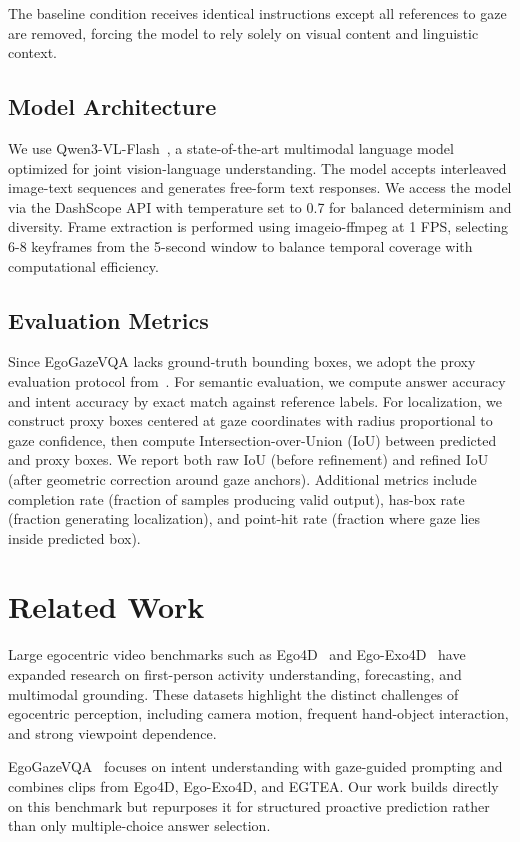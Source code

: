 \documentclass[11pt]{article}
\begin{document}
The baseline condition receives identical instructions except all references to gaze are removed, forcing the model to rely solely on visual content and linguistic context.

\subsection{Model Architecture}
We use Qwen3-VL-Flash~\cite{bai2025qwen3vl}, a state-of-the-art multimodal language model optimized for joint vision-language understanding. The model accepts interleaved image-text sequences and generates free-form text responses. We access the model via the DashScope API with temperature set to 0.7 for balanced determinism and diversity. Frame extraction is performed using imageio-ffmpeg at 1 FPS, selecting 6-8 keyframes from the 5-second window to balance temporal coverage with computational efficiency.

\subsection{Evaluation Metrics}
Since EgoGazeVQA lacks ground-truth bounding boxes, we adopt the proxy evaluation protocol from~\citet{peng2025eye}. For semantic evaluation, we compute answer accuracy and intent accuracy by exact match against reference labels. For localization, we construct proxy boxes centered at gaze coordinates with radius proportional to gaze confidence, then compute Intersection-over-Union (IoU) between predicted and proxy boxes. We report both raw IoU (before refinement) and refined IoU (after geometric correction around gaze anchors). Additional metrics include completion rate (fraction of samples producing valid output), has-box rate (fraction generating localization), and point-hit rate (fraction where gaze lies inside predicted box).

\section{Related Work}
Large egocentric video benchmarks such as Ego4D~\citep{grauman2022ego4d} and Ego-Exo4D~\citep{grauman2024egoexo4d} have expanded research on first-person activity understanding, forecasting, and multimodal grounding. These datasets highlight the distinct challenges of egocentric perception, including camera motion, frequent hand-object interaction, and strong viewpoint dependence.

EgoGazeVQA~\citep{peng2025eye} focuses on intent understanding with gaze-guided prompting and combines clips from Ego4D, Ego-Exo4D, and EGTEA. Our work builds directly on this benchmark but repurposes it for structured proactive prediction rather than only multiple-choice answer selection.
\end{document}
